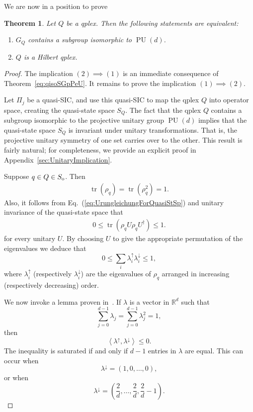 \documentclass[aps,pra,superscriptaddress,10pt,tightenlines,twocolumn,nofootinbib]{revtex4}
\newtheorem{theorem}{Theorem}
\theoremstyle{remark}
\newcommand{\be}{\begin{equation}}
\newcommand{\ee}{\end{equation}}
\newcommand{\ea}[1]{\begin{align}#1\end{align}}
\newcommand{\so}{S_{\rm{o}}}
\newcommand{\qp}{Q}
\newcommand{\qplex}{qplex}
\newcommand{\qgp}[1]{G_{#1}}
\newcommand{\inprod}[2]{{\left\langle #1 , #2 \right\rangle}}
\DeclareMathOperator{\PU}{PU}
\DeclareMathOperator{\Tr}{tr}
\begin{document}
We are now in a position to prove
\begin{theorem}
\label{thm:QStateCriterion}
Let $\qp$ be a \qplex.  Then the following statements are equivalent:
\begin{enumerate}
\item $\qgp{\qp}$ contains a subgroup isomorphic to $\PU(d)$.
\item $\qp$ is a Hilbert qplex.
\end{enumerate}
\end{theorem}
\begin{proof}
The implication $(2)\implies (1)$ is an immediate consequence of Theorem~\ref{eq:qisoSGpPeU}.  It remains to prove the implication $(1) \implies (2)$.

Let $\Pi_j$ be a quasi-SIC, and use this quasi-SIC to map the qplex $\qp$ into operator space, creating the quasi-state space $S_\qp$.  The fact that the \qplex{} $\qp$ contains a subgroup isomorphic to the projective unitary group $\PU(d)$ implies that the quasi-state space $S_\qp$ is invariant under unitary transformations.  That is, the projective unitary symmetry of one set carries over to the other.  This result is fairly natural; for completeness, we provide an explicit proof in Appendix~\ref{sec:UnitaryImplication}.

Suppose $q\in \qp\in \so$.  Then
\ea{
\Tr(\rho_q) = \Tr(\rho_q^2) = 1.
}
Also, it follows from Eq.~(\ref{eq:UrungleichungForQuasiStSp}) and unitary invariance of the quasi-state space that
\ea{
0 \le \Tr(\rho_q U\rho_qU^{\dagger}) \le 1.
}
for every unitary $U$.  By choosing $U$ to give the appropriate permutation of the eigenvalues we deduce that
\be
0 \le \sum_i \lambda^{\uparrow}_i \lambda^{\downarrow}_i \le 1,
\ee
where $\lambda^{\uparrow}_i$ (respectively $\lambda^{\downarrow}_i $) are the eigenvalues of $\rho_q$ arranged in increasing (respectively decreasing) order.

We now invoke a lemma proven in~\cite{GroupAlg}.  If $\lambda$ is a vector in $\mathbb{R}^d$ such that
\be
\sum_{j=0}^{d-1} \lambda_j = \sum_{j=0}^{d-1} \lambda_j^2 = 1,
\ee
then
\be
\inprod{\lambda^{\uparrow}}{\lambda^{\downarrow}} \leq 0.
\ee
The inequality is saturated if and only if $d-1$ entries in $\lambda$ are equal.  This can occur when
\be
\lambda^{\downarrow} = (1,0,\ldots,0),
\ee
or when
\be
\lambda^{\downarrow} = \left(\frac{2}{d},\ldots,\frac{2}{d},
 \frac{2}{d} - 1\right).
\ee


\end{proof}
\end{document}
